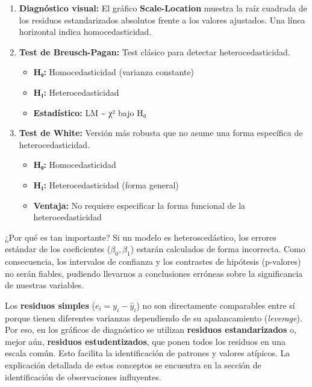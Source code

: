 \documentclass[
  letterpaper,
  DIV=11,
  numbers=noendperiod]{scrreprt}
\providecommand{\tightlist}{%
  \setlength{\itemsep}{0pt}\setlength{\parskip}{0pt}}
\begin{document}
\begin{enumerate}
\def\labelenumi{\arabic{enumi}.}
\item
  \textbf{Diagnóstico visual:} El gráfico \textbf{Scale-Location}
  muestra la raíz cuadrada de los residuos estandarizados absolutos
  frente a los valores ajustados. Una línea horizontal indica
  homocedasticidad.
\item
  \textbf{Test de Breusch-Pagan:} Test clásico para detectar
  heterocedasticidad.

  \begin{itemize}
  \tightlist
  \item
    \textbf{H₀:} Homocedasticidad (varianza constante)
  \item
    \textbf{H₁:} Heterocedasticidad
  \item
    \textbf{Estadístico:} LM \textasciitilde{} χ² bajo H₀
  \end{itemize}
\item
  \textbf{Test de White:} Versión más robusta que no asume una forma
  específica de heterocedasticidad.

  \begin{itemize}
  \tightlist
  \item
    \textbf{H₀:} Homocedasticidad
  \item
    \textbf{H₁:} Heterocedasticidad (forma general)
  \item
    \textbf{Ventaja:} No requiere especificar la forma funcional de la
    heterocedasticidad
  \end{itemize}
\end{enumerate}

¿Por qué es tan importante? Si un modelo es heteroscedástico, los
errores estándar de los coeficientes (\(\beta_0, \beta_1\)) estarán
calculados de forma incorrecta. Como consecuencia, los intervalos de
confianza y los contrastes de hipótesis (p-valores) no serán fiables,
pudiendo llevarnos a conclusiones erróneas sobre la significancia de
nuestras variables.

\begin{tcolorbox}[enhanced jigsaw, leftrule=.75mm, breakable, colbacktitle=quarto-callout-note-color!10!white, bottomrule=.15mm, colframe=quarto-callout-note-color-frame, toprule=.15mm, colback=white, coltitle=black, bottomtitle=1mm, left=2mm, title=\textcolor{quarto-callout-note-color}{\faInfo}\hspace{0.5em}{Sobre los residuos estandarizados}, opacityback=0, arc=.35mm, opacitybacktitle=0.6, toptitle=1mm, titlerule=0mm, rightrule=.15mm]

Los \textbf{residuos simples} (\(e_i = y_i - \hat{y}_i\)) no son
directamente comparables entre sí porque tienen diferentes varianzas
dependiendo de su apalancamiento (\emph{leverage}). Por eso, en los
gráficos de diagnóstico se utilizan \textbf{residuos estandarizados} o,
mejor aún, \textbf{residuos estudentizados}, que ponen todos los
residuos en una escala común. Esto facilita la identificación de
patrones y valores atípicos. La explicación detallada de estos conceptos
se encuentra en la sección de identificación de observaciones
influyentes.

\end{tcolorbox}
\end{document}
